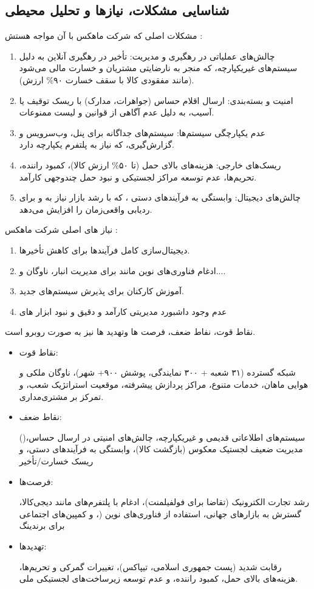 \documentclass[12pt,a4paper]{report}
\begin{document}
\subsection{شناسایی مشکلات، نیازها و تحلیل محیطی}
مشکلات اصلی که شرکت ماهکس با آن مواجه هستش :
\begin{enumerate}
	\item 
	چالش‌های عملیاتی در رهگیری و مدیریت: تأخیر در رهگیری آنلاین به دلیل سیستم‌های غیریکپارچه، که منجر به نارضایتی مشتریان و خسارت مالی می‌شود (مانند مفقودی کالا با سقف خسارت ۹۰\% ارزش).
	\item 
امنیت و بسته‌بندی: ارسال اقلام حساس (جواهرات، مدارک) با ریسک توقیف یا آسیب، به دلیل عدم آگاهی از قوانین و لیست ممنوعات.
	\item 
عدم یکپارچگی سیستم‌ها: سیستم‌های جداگانه برای پنل، وب‌سرویس و گزارش‌گیری، که نیاز به پلتفرم  یکپارچه دارد.
	\item 
	ریسک‌های خارجی: هزینه‌های بالای حمل (تا ۵۰\% ارزش کالا)، کمبود راننده، تحریم‌ها، عدم توسعه مراکز لجستیکی و نبود حمل چندوجهی کارآمد.
	\item 
	چالش‌های دیجیتال: وابستگی به فرآیندهای دستی ، که با رشد بازار نیاز به  و  برای ردیابی واقعی‌زمان را افزایش می‌دهد.
\end{enumerate}

نیاز های اصلی شرکت ماهکس  :
\begin{enumerate}
	\item 
دیجیتال‌سازی کامل فرآیندها برای کاهش تأخیرها.
	\item 
ادغام فناوری‌های نوین مانند  برای مدیریت انبار، ناوگان و....
	\item 
آموزش کارکنان برای پذیرش سیستم‌های جدید.
	\item 
عدم وجود داشبورد مدیریتی کارآمد و دقیق و نبود ابزار های 
\end{enumerate}

 نقاط قوت، نفاط ضعف، فرصت ها وتهدید ها نیز به صورت روبرو است.
\begin{itemize}
	\item نقاط قوت:
	
شبکه گسترده (۳۱ شعبه + ۳۰۰ نمایندگی، پوشش ۹۰۰+ شهر)، ناوگان ملکی و هوایی ماهان، خدمات متنوع، مراکز پردازش پیشرفته، موقعیت استراتژیک شعب، و تمرکز بر مشتری‌مداری.
	\item نقاط ضعف:
	
	()سیستم‌های اطلاعاتی قدیمی و غیریکپارچه، چالش‌های امنیتی در ارسال حساس، مدیریت ضعیف لجستیک معکوس (بازگشت کالا)، وابستگی به فرآیندهای دستی، و ریسک خسارت/تأخیر
	\item فرصت‌ها:
	
رشد تجارت الکترونیک (تقاضا برای فولفیلمنت)، ادغام با پلتفرم‌های مانند دیجی‌کالا، گسترش به بازارهای جهانی، استفاده از فناوری‌های نوین (، و کمپین‌های اجتماعی برای برندینگ
	\item تهدیدها:

رقابت شدید (پست جمهوری اسلامی، تیپاکس)، تغییرات گمرکی و تحریم‌ها، هزینه‌های بالای حمل، کمبود راننده، و عدم توسعه زیرساخت‌های لجستیکی ملی.
\end{itemize}
\end{document}

